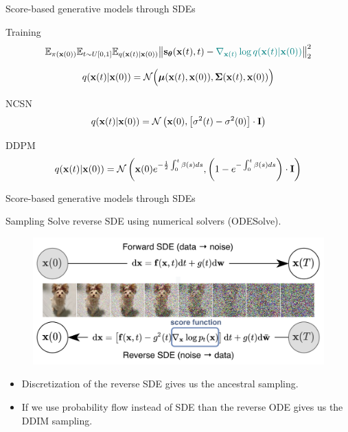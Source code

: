 \begin{frame}{Score-based generative models through SDEs}
	\begin{block}{Training}
		\vspace{-0.5cm}
		\[
			\mathbb{E}_{\pi(\mathbf{x}(0))} \mathbb{E}_{t \sim U[0, 1]} \mathbb{E}_{q(\mathbf{x}(t) | \mathbf{x}(0))}\bigl\| \mathbf{s}_{\boldsymbol{\theta}}(\mathbf{x}(t), t) - {\color{teal}\nabla_{\mathbf{x}(t)} \log q(\mathbf{x}(t) | \mathbf{x}(0))} \bigr\|^2_2 
		\]
		\vspace{-0.7cm}
	\end{block}
	\[
		q(\mathbf{x}(t) | \mathbf{x}(0)) = \mathcal{N}\Bigl(\boldsymbol{\mu}(\mathbf{x}(t), \mathbf{x}(0)), \boldsymbol{\Sigma}(\mathbf{x}(t), \mathbf{x}(0))\Bigr)
	\]
	\vspace{-0.5cm}
	\begin{block}{NCSN}
		\vspace{-0.3cm}
		\[
			q(\mathbf{x}(t) | \mathbf{x}(0)) = \mathcal{N}\left(\mathbf{x}(0), \left[\sigma^2(t) - \sigma^2(0)\right] \cdot \mathbf{I}\right)
		\]
		\vspace{-0.5cm}
	\end{block}
	\begin{block}{DDPM}
		\vspace{-0.3cm}
		\[
			q(\mathbf{x}(t) | \mathbf{x}(0)) = \mathcal{N}\left(\mathbf{x}(0) e^{-\frac{1}{2} \int_0^t\beta(s)ds}, \left(1 - e^{- \int_0^t\beta(s)ds}\right) \cdot \mathbf{I}\right)
		\]
		\vspace{-0.5cm}
	\end{block}
	
\end{frame}
\begin{frame}{Score-based generative models through SDEs}
	\begin{block}{Sampling}
		Solve reverse SDE using numerical solvers (ODESolve).
		\begin{figure}
			\includegraphics[width=0.8\linewidth]{figs/sbgm}
		\end{figure}
		\vspace{-0.5cm}
	\end{block}
	\begin{itemize}
		\item Discretization of the reverse SDE gives us the ancestral sampling.
		\item If we use probability flow instead of SDE than the reverse ODE gives us the DDIM sampling.
	\end{itemize}
\end{frame}

